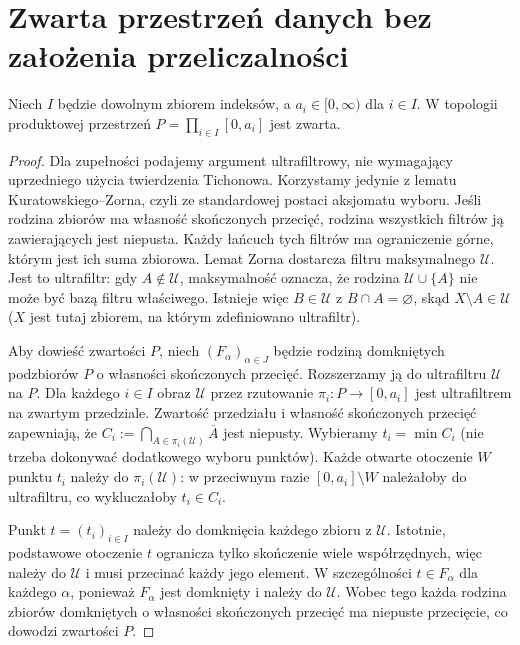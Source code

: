 \section{Zwarta przestrzeń danych bez założenia przeliczalności}
\begin{lemat}
\label{lem:haar-product-compact-23}
Niech $I$ będzie dowolnym zbiorem indeksów, a
$a_i\in[0,\infty)$ dla $i\in I$. W topologii produktowej
przestrzeń $P=\prod_{i\in I}[0,a_i]$ jest zwarta.
\end{lemat}
\begin{proof}
Dla zupełności podajemy argument ultrafiltrowy, nie wymagający
uprzedniego użycia twierdzenia Tichonowa. Korzystamy jedynie
z lematu Kuratowskiego--Zorna, czyli ze standardowej postaci
aksjomatu wyboru. Jeśli rodzina zbiorów ma własność skończonych
przecięć, rodzina wszystkich filtrów ją zawierających jest
niepusta. Każdy łańcuch tych filtrów ma ograniczenie górne,
którym jest ich suma zbiorowa. Lemat Zorna dostarcza filtru
maksymalnego $\mathcal U$. Jest to ultrafiltr: gdy $A\notin\mathcal U$, maksymalność oznacza, że
rodzina $\mathcal U\cup\{A\}$ nie może być bazą filtru
właściwego. Istnieje więc $B\in\mathcal U$ z
$B\cap A=\varnothing$, skąd $X\setminus A\in\mathcal U$
($X$ jest tutaj zbiorem, na którym zdefiniowano ultrafiltr).

Aby dowieść zwartości $P$, niech $(F_\alpha)_{\alpha\in J}$
będzie rodziną domkniętych podzbiorów $P$ o własności
skończonych przecięć. Rozszerzamy ją do ultrafiltru
$\mathcal U$ na $P$. Dla każdego $i\in I$ obraz
$\mathcal U$ przez rzutowanie $\pi_i:P\to[0,a_i]$
jest ultrafiltrem na zwartym przedziale. Zwartość przedziału
i własność skończonych przecięć zapewniają, że
$C_i:=\bigcap_{A\in\pi_i(\mathcal U)}\overline A$ jest niepusty.
Wybieramy $t_i=\min C_i$ (nie trzeba dokonywać dodatkowego
wyboru punktów). Każde otwarte otoczenie $W$ punktu $t_i$
należy do $\pi_i(\mathcal U)$: w przeciwnym razie
$[0,a_i]\setminus W$ należałoby do ultrafiltru,
co wykluczałoby $t_i\in C_i$.

Punkt $t=(t_i)_{i\in I}$ należy do domknięcia każdego
zbioru z $\mathcal U$. Istotnie, podstawowe otoczenie
$t$ ogranicza tylko skończenie wiele współrzędnych,
więc należy do $\mathcal U$ i musi przecinać każdy
jego element. W szczególności $t\in F_\alpha$ dla
każdego $\alpha$, ponieważ $F_\alpha$ jest domknięty
i należy do $\mathcal U$. Wobec tego każda rodzina
zbiorów domkniętych o własności skończonych przecięć
ma niepuste przecięcie, co dowodzi zwartości $P$.
\end{proof}


